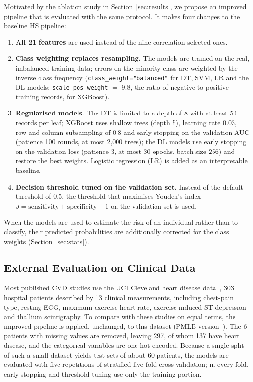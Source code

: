 \documentclass[11pt,a4paper]{article}
\begin{document}
Motivated by the ablation study in Section~\ref{sec:results}, we propose
an improved pipeline that is evaluated with the same protocol. It makes four changes to the baseline HS
pipeline:
\begin{enumerate}
  \item \textbf{All 21 features} are used instead of the nine
    correlation-selected ones.
  \item \textbf{Class weighting replaces resampling.} The models are
    trained on the real, imbalanced training data; errors on the minority
    class are weighted by the inverse class frequency
    (\texttt{class\_weight="balanced"} for DT, SVM, LR and the DL models;
    \texttt{scale\_pos\_weight} $=$ 9.8, the ratio of negative to positive training records, for XGBoost).
  \item \textbf{Regularised models.} The DT is limited to a depth of 8 with
    at least 50 records per leaf; XGBoost uses shallow trees (depth 5),
    learning rate 0.03, row and column subsampling of 0.8 and early
    stopping on the validation AUC (patience 100 rounds, at most 2,000
    trees); the DL models use early stopping on the validation loss
    (patience 3, at most 30 epochs, batch size 256) and restore the best
    weights. Logistic regression (LR) is added as an interpretable baseline.
  \item \textbf{Decision threshold tuned on the validation set.} Instead of
    the default threshold of 0.5, the threshold that maximises Youden's
    index $J = \text{sensitivity} + \text{specificity} - 1$ on the
    validation set is used.
\end{enumerate}
When the models are used to estimate the risk of an individual rather than
to classify, their predicted probabilities are additionally corrected for
the class weights (Section~\ref{sec:stats}).

\subsection{External Evaluation on Clinical Data}
\label{sec:cleveland}

Most published CVD studies use the UCI Cleveland heart disease
data~\cite{detrano}, 303 hospital patients described by 13 clinical
measurements, including chest-pain type, resting ECG, maximum exercise heart
rate, exercise-induced ST depression and thallium scintigraphy. To compare
with these studies on equal terms, the improved pipeline is applied,
unchanged, to this dataset (PMLB version~\cite{pmlb}). The 6 patients with
missing values are removed, leaving 297, of whom 137 have heart disease, and
the categorical variables are one-hot encoded. Because a single split of
such a small dataset yields test sets of about 60 patients, the models are
evaluated with five repetitions of stratified five-fold cross-validation; in
every fold, early stopping and threshold tuning use only the training
portion.
\end{document}
